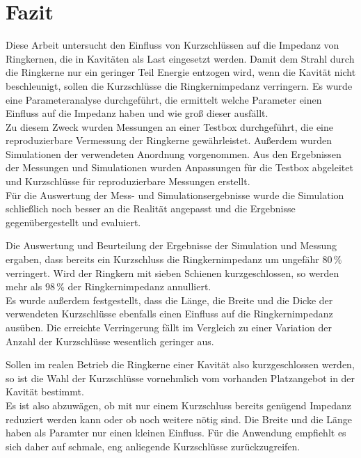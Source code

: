 \section{Fazit}\label{sec:fazit}
Diese Arbeit untersucht den Einfluss von Kurzschlüssen auf die Impedanz von Ringkernen, die in Kavitäten als Last eingesetzt werden. Damit dem Strahl durch die Ringkerne nur ein geringer Teil Energie entzogen wird, wenn die Kavität nicht beschleunigt, sollen die Kurzschlüsse die Ringkernimpedanz verringern. Es wurde eine Parameteranalyse durchgeführt, die ermittelt welche Parameter einen Einfluss auf die Impedanz haben und wie groß dieser ausfällt.\\
Zu diesem Zweck wurden Messungen an einer Testbox durchgeführt, die eine reproduzierbare Vermessung der Ringkerne gewährleistet. Außerdem wurden Simulationen der verwendeten Anordnung vorgenommen. Aus den Ergebnissen der Messungen und Simulationen wurden Anpassungen für die Testbox abgeleitet und Kurzschlüsse für reproduzierbare Messungen erstellt.\\
Für die Auswertung der Mess- und Simulationsergebnisse wurde die Simulation schließlich noch besser an die Realität angepasst und die Ergebnisse gegenübergestellt und evaluiert.
\par
Die Auswertung und Beurteilung der Ergebnisse der Simulation und Messung ergaben, dass bereits ein Kurzschluss die Ringkernimpedanz um ungefähr $80\,\%$ verringert. Wird der Ringkern mit sieben Schienen kurzgeschlossen, so werden mehr als $98\,\%$ der Ringkernimpedanz annulliert.\\
Es wurde außerdem festgestellt, dass die Länge, die Breite und die Dicke der verwendeten Kurzschlüsse ebenfalls einen Einfluss auf die Ringkernimpedanz ausüben. Die erreichte Verringerung fällt im Vergleich zu einer Variation der Anzahl der Kurzschlüsse wesentlich geringer aus.
\par
Sollen im realen Betrieb die Ringkerne einer Kavität also kurzgeschlossen werden, so ist die Wahl der Kurzschlüsse vornehmlich vom vorhanden Platzangebot in der Kavität bestimmt.\\
Es ist also abzuwägen, ob mit nur einem Kurzschluss bereits genügend Impedanz reduziert werden kann oder ob noch weitere nötig sind. Die Breite und die Länge haben als Paramter nur einen kleinen Einfluss. Für die Anwendung empfiehlt es sich daher auf schmale, eng anliegende Kurzschlüsse zurückzugreifen. 
\par


